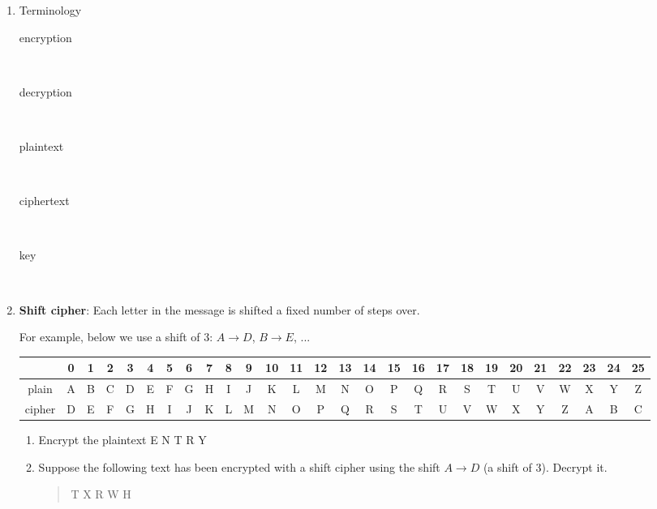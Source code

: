 \documentclass[12pt]{article}
\renewcommand{\emph}[1]{\textsf{\textbf{#1}}}
\newcommand{\be}{\begin{enumerate}}
\newcommand{\ee}{\end{enumerate}}
\begin{document}
\begin{enumerate}
\item Terminology
\begin{description}
\item[encryption] \
\vfill

\item[decryption] \ \vfill


\item[plaintext] \ \vfill

\item[ciphertext] \

\vfill

\item[key] \ \vfill

\end{description}

\item \emph{Shift cipher}: Each letter in the message is shifted a fixed number of  steps over.

For example, below we use a shift of 3:  $A \to D$, $B \to E$, ...

{\scriptsize
\hspace*{-1.5cm}
\begin{tabular}{|c|c|c|c|c|c|c|c|c|c|c|c|c|c|c|c|c|c|c|c|c|c|c|c|c|c|c|}
\hline
&0&1&2&3&4&5&6&7&8&9&10&11&12&13&14&15&16&17&18&19&20&21&22&23&24&25\\ \hline \hline
plain& A&B&C&D&E&F&G&H&I&J&K&L&M&N&O&P&Q&R&S&T&U&V&W&X&Y&Z\\  \hline
cipher&D&E&F&G&H&I&J&K&L&M&N&O&P&Q&R&S&T&U&V&W&X&Y&Z&A&B&C\\
\hline
\end{tabular}
}

\be
\item Encrypt the plaintext \textsf{E N T R Y}

\vfill

\item Suppose the following text has been encrypted with a shift cipher using the shift $A \to D$ (a shift of 3). Decrypt it.
\begin{quote}\textsf{T X R W H} \end{quote}

\vfill

\ee
\end{enumerate}
\end{document}
